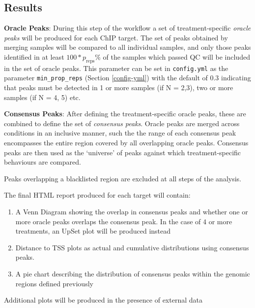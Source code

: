 \documentclass[
]{book}
\providecommand{\tightlist}{%
  \setlength{\itemsep}{0pt}\setlength{\parskip}{0pt}}
\begin{document}
\hypertarget{results}{%
\subsection*{Results}\label{results}}

\textbf{Oracle Peaks}: During this step of the workflow a set of treatment-specific \emph{oracle peaks} will be produced for each ChIP target.
The set of peaks obtained by merging samples will be compared to all individual samples, and only those peaks identified in at least \(100*p_\text{reps}\%\) of the samples which passed QC will be included in the set of oracle peaks.
This parameter can be set in \texttt{config.yml} as the parameter \texttt{min\_prop\_reps} (Section \ref{config-yml}) with the default of 0.3 indicating that peaks must be detected in 1 or more samples (if N = 2,3), two or more samples (if N = 4, 5) etc.

\textbf{Consensus Peaks}: After defining the treatment-specific oracle peaks, these are combined to define the set of \emph{consensus peaks}.
Oracle peaks are merged across conditions in an inclusive manner, such the the range of each consensus peak encompasses the entire region covered by all overlapping oracle peaks.
Consensus peaks are then used as the `universe' of peaks against which treatment-specific behaviours are compared.

Peaks overlapping a blacklisted region are excluded at all steps of the analysis.

The final HTML report produced for each target will contain:

\begin{enumerate}
\def\labelenumi{\arabic{enumi}.}
\tightlist
\item
  A Venn Diagram showing the overlap in consensus peaks and whether one or more oracle peaks overlaps the consensus peak. In the case of 4 or more treatments, an UpSet plot\citep{upsetr} will be produced instead
\item
  Distance to TSS plots as actual and cumulative distributions using consensus peaks.
\item
  A pie chart describing the distribution of consensus peaks within the genomic regions defined previously
\end{enumerate}

Additional plots will be produced in the presence of external data
\end{document}
